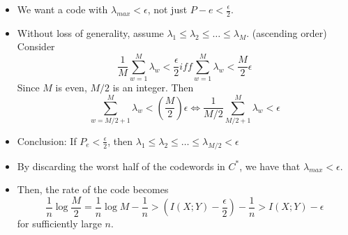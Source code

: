 \documentclass[../main.tex]{subfiles}
\begin{document}
\begin{itemize}
    \item We want a code with $\lambda_{max}<\epsilon$, not just $P-e<\frac{\epsilon}{2}$.
    \item Without loss of generality, assume $\lambda_1\leq \lambda_2\leq \dots\leq \lambda_M$. (ascending order) Consider \[
    \frac{1}{M}\sum_{w=1}^M\lambda_w < \frac{\epsilon}{2} iff \sum_{w=1}^M\lambda_w < \frac{M}{2}\epsilon
    \]
    Since $M$ is even, $M/2$
 is an integer. Then \[
 \sum_{w=M/2+1}^M\lambda_w < (\frac{M}{2})\epsilon\iff \frac{1}{M/2}\sum_{M/2+1}^M\lambda_w < \epsilon
 \]
 \item Conclusion: If $P_e<\frac{\epsilon}{2}$, then $\lambda_1\leq \lambda_2\leq \dots\leq \lambda_{M/2}<\epsilon$
 \item By discarding the worst half of the codewords in $C^*$, we have that $\lambda_{max}<\epsilon$.
 \item Then, the rate of the code becomes \[
 \frac{1}{n}\log \frac{M}{2} = \frac{1}{n}\log M-\frac{1}{n} > (I(X;Y)-\frac{\epsilon}{2})-\frac{1}{n} > I(X;Y)-\epsilon
 \] for sufficiently large $n$.
 \end{itemize}
\end{document}
